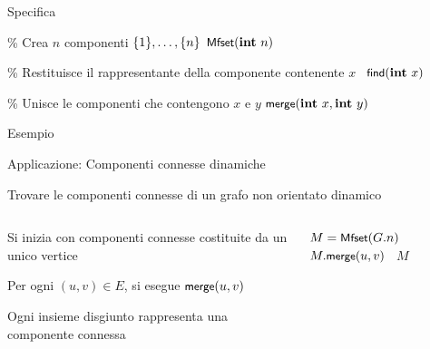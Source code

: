 \begin{frame}{Specifica}

\vspace{-9pt}
\begin{Procedure}
\caption[A]{\mfset}

\BlankLine
\% Crea $n$ componenti $\{1\}, \ldots, \{n\}$\;
\mfset $\mfconstructor(\INTEGER\ n)$\;

\BlankLine
\% Restituisce il rappresentante della componente contenente $x$\;
\INTEGER\ $\mffind(\INTEGER\ x)$\;

\BlankLine
\% Unisce le componenti che contengono $x$ e $y$\;
$\mfmerge(\INTEGER\ x, \INTEGER\ y)$\;
 
\BlankLine
\end{Procedure}

\end{frame}

\begin{frame}{Esempio}
\vspace{-9pt}
\end{frame}

\begin{frame}{Applicazione: Componenti connesse dinamiche}

\vspace{-9pt}
\begin{myboxtitle}[Problema]
Trovare le componenti connesse di un grafo non orientato \alert{dinamico}
\end{myboxtitle}

\begin{columns}[T]
\vspace{-9pt}
\begin{myboxtitle}[Algoritmo]
\BIL
\item Si inizia con componenti connesse costituite da un unico vertice
\item Per ogni $(u,v) \in E$, si esegue $\textsf{{\small merge}}(u, v)$ 
\item Ogni insieme disgiunto rappresenta
una componente connessa
\EIL
\end{myboxtitle}
\vspace{-9pt}
\begin{Procedure}
\caption[A]{\mfset\ \connectedcomponents($\Graph\ G$)}

\mfset $M = \textsf{{\small Mfset}}(G.n)$\;
{
  {
    $M.\textsf{{\small merge}}(u, v)$\;
  }
}
\Return\ $M$\;
\end{Procedure}

\end{columns}

\end{frame}

